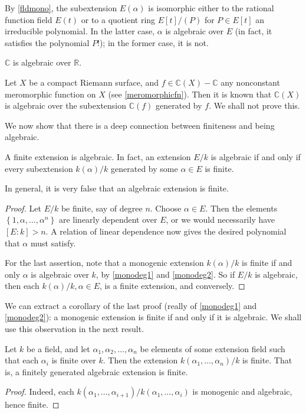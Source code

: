 By \cref{fldmono}, the subextension $E(\alpha)$ is isomorphic either to
the rational function field $E(t)$ or to a quotient ring $E[t]/(P)$ for $P
\in E[t]$ an irreducible polynomial. 
In the latter case, $\alpha$ is algebraic over $E$ (in fact, it
satisfies the polynomial $P$!); in the former case, it is not.

\begin{example} 
$\mathbb{C}$ is algebraic over $\mathbb{R}$.
\end{example} 

\begin{example} 
Let $X$ be a compact Riemann surface, and $f \in \mathbb{C}(X) - \mathbb{C}$ any
nonconstant meromorphic function on $X$ (see \cref{meromorphicfn}). Then it is known that
$\mathbb{C}(X)$ is algebraic over the subextension $\mathbb{C}(f)$ generated by
$f$. We shall not prove this.
\end{example} 

We now show that there is a deep connection between finiteness and being
algebraic.
\begin{proposition} \label{finalgebraic}
A finite extension is algebraic. 
In fact, an extension $E/k$ is algebraic if and only if every subextension
$k(\alpha)/k$ generated by some $\alpha \in E$ is finite.
\end{proposition} 
In general, it is very false that an algebraic extension is finite.
\begin{proof} 
Let $E/k$ be finite, say of degree $n$. Choose $\alpha \in E$.
Then the elements 
$\left\{1, \alpha, \dots, \alpha^n\right\}$ are linearly
dependent over $E$, or we would necessarily have $[E:k] > n$. A relation of
linear dependence now gives the desired polynomial that $\alpha$ must satisfy.

For the last assertion, note that a monogenic extension  $k(\alpha)/k$ is
finite if and only $\alpha$ is algebraic over $k$, by \cref{monodeg1} and
\cref{monodeg2}.
So if $E/k$ is algebraic, then each $k(\alpha)/k, \alpha \in E$, is a finite
extension, and conversely.
\end{proof} 



We can extract a corollary of the last proof (really of \cref{monodeg1} and
\cref{monodeg2}): a monogenic extension is finite
if and only if it is algebraic.
We shall use this observation in the next result.

\begin{corollary} \label{fingenalg}
Let $k$ be a field, and let $\alpha_1, \alpha_2, \dots, \alpha_n$ be elements
of some extension field such that each $\alpha_i$ is finite over $k$. Then the
extension $k(\alpha_1, \dots, \alpha_n)/k$ is finite.
That is, a finitely generated algebraic extension is finite.
\end{corollary} 
\begin{proof} 
Indeed, each $k(\alpha_{1}, \dots, \alpha_{i+1})/k(\alpha_1, \dots,
\alpha_{i})$ is monogenic and algebraic, hence finite.
\end{proof} 

